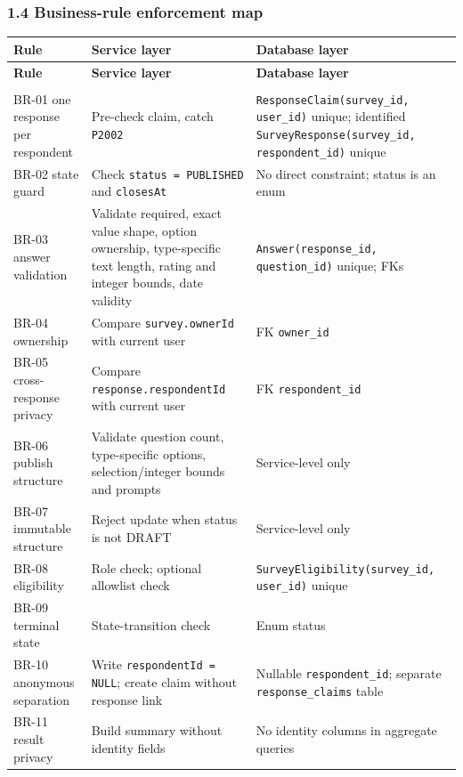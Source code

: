 \documentclass[12pt,a4paper]{article}
\begin{document}
\subsubsection*{1.4 Business-rule enforcement map}
{\setlength{\tabcolsep}{3pt}\renewcommand{\arraystretch}{1.08}\small
\begin{longtable}{@{}>{\raggedright\arraybackslash}p{}>{\raggedright\arraybackslash}p{}>{\raggedright\arraybackslash}p{}@{}}
\toprule
\textbf{Rule} & \textbf{Service layer} & \textbf{Database layer} \\
\midrule
\endfirsthead
\toprule
\textbf{Rule} & \textbf{Service layer} & \textbf{Database layer} \\
\midrule
\endhead
\midrule
\multicolumn{3}{r}{\footnotesize\textit{Continued on next page}}\\
\endfoot
\bottomrule
\endlastfoot
BR-01 one response per respondent & Pre-check claim, catch \texttt{P2002} & \texttt{ResponseClaim(survey\_id, user\_id)} unique; identified \texttt{SurveyResponse(survey\_id, respondent\_id)} unique \\
BR-02 state guard & Check \texttt{status = PUBLISHED} and \texttt{closesAt} & No direct constraint; status is an enum \\
BR-03 answer validation & Validate required, exact value shape, option ownership, type-specific text length, rating and integer bounds, date validity & \texttt{Answer(response\_id, question\_id)} unique; FKs \\
BR-04 ownership & Compare \texttt{survey.ownerId} with current user & FK \texttt{owner\_id} \\
BR-05 cross-response privacy & Compare \texttt{response.respondentId} with current user & FK \texttt{respondent\_id} \\
BR-06 publish structure & Validate question count, type-specific options, selection/integer bounds and prompts & Service-level only \\
BR-07 immutable structure & Reject update when status is not DRAFT & Service-level only \\
BR-08 eligibility & Role check; optional allowlist check & \texttt{SurveyEligibility(survey\_id, user\_id)} unique \\
BR-09 terminal state & State-transition check & Enum status \\
BR-10 anonymous separation & Write \texttt{respondentId = NULL}; create claim without response link & Nullable \texttt{respondent\_id}; separate \texttt{response\_claims} table \\
BR-11 result privacy & Build summary without identity fields & No identity columns in aggregate queries \\
\end{longtable}}
\end{document}
